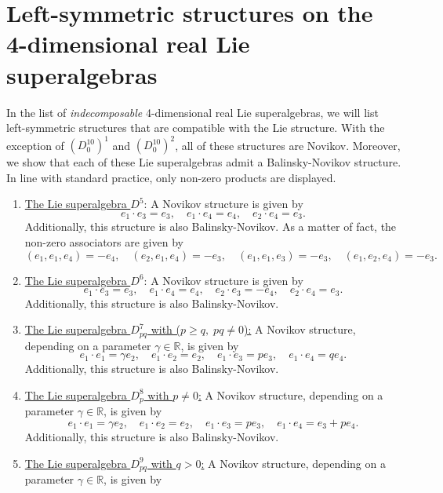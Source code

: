 \documentclass[12pt]{amsart}
\begin{document}
\newpage 

\section{Left-symmetric structures on the 4-dimensional real Lie superalgebras}\label{leftsym}
In the list of {\it indecomposable} 4-dimensional real Lie superalgebras, we will list left-symmetric structures that are compatible with the Lie structure. With the exception of $(D_0^{10})^1$ and $(D_0^{10})^2$, all of these structures are Novikov. Moreover, we show that each of these Lie superalgebras admit a Balinsky-Novikov structure. In line with standard practice, only non-zero products are displayed. 
\begin{enumerate}
    \item \underline{The Lie superalgebra $D^5$}: A Novikov structure is given by 
    \[
    e_1\cdot e_3=  e_3,   \quad e_1\cdot e_4=e_4, \quad e_2\cdot e_4=e_3. 
    \]
    Additionally, this structure is also Balinsky-Novikov. As a matter of fact, the non-zero associators are given by
    \[
    (e_1, e_1, e_4)=-e_4, \quad  (e_2, e_1, e_4)=- e_3, \quad (e_1,e_1,e_3)=-e_3, \quad (e_1, e_2, e_4)=-e_3.
    \]
    \item \underline{The Lie superalgebra $D^6$}: A Novikov structure is given by
    \[
e_1\cdot e_3=e_3, \quad e_1\cdot e_4=e_4, \quad e_2\cdot e_3=-e_4, \quad e_2\cdot e_4=e_3.
    \]
     Additionally, this structure is also Balinsky-Novikov.
    \item \underline{The Lie superalgebra $D^7_{pq}$ with ($p\geq q, \; pq\not=0$):} A Novikov structure, depending on a parameter $\gamma \in \mathbb R$, is given by
     \[
e_1\cdot e_1= \gamma e_2, \quad e_1\cdot e_2=e_2, \quad e_1\cdot e_3=p e_3, \quad e_1\cdot e_4=q e_4.
\]
 Additionally, this structure is also Balinsky-Novikov.
 \item \underline{The Lie superalgebra $D^8_{p}$ with $ p\not=0$:} A Novikov structure, depending on a parameter $\gamma \in \mathbb R$, is given by
    \[
    e_1\cdot e_1= \gamma e_2, \quad e_1\cdot e_2=e_2, \quad e_1\cdot e_3=p  e_3, \quad e_1\cdot e_4=e_3+ p e_4.
    \]
     Additionally, this structure is also Balinsky-Novikov.
     \item \underline{The Lie superalgebra $D^9_{pq}$ with $ q>0$:} A Novikov structure, depending on a parameter $\gamma \in \mathbb R$, is given by
      \[
      \begin{array}{llll}

\end{array}\]
\end{enumerate}
\end{document}
